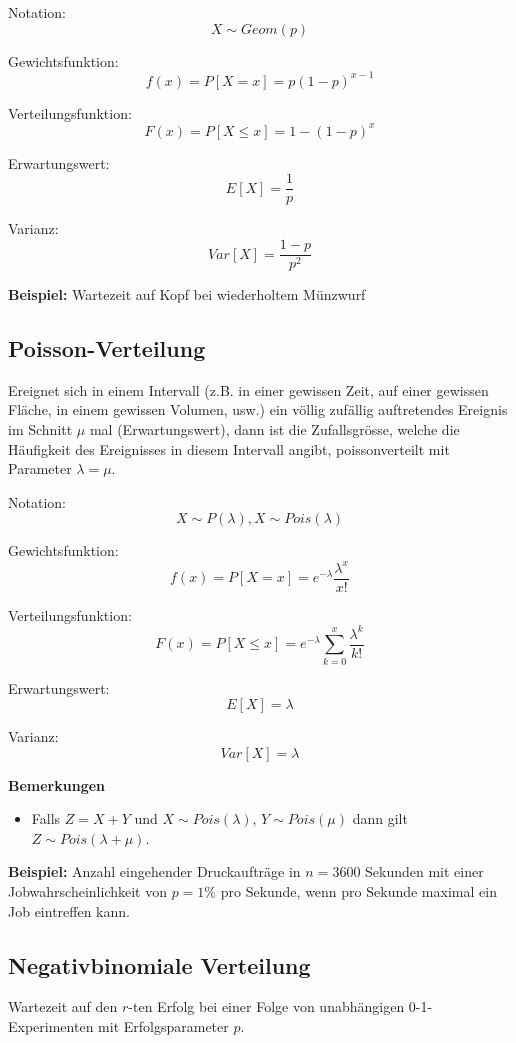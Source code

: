 \documentclass[10pt,a4paper,twocolumn]{article}
\begin{document}
\vspace{10pt}

Notation:
\[
X \sim Geom(p)
\]

Gewichtsfunktion:
\[
f(x)=P[X=x]=p(1-p)^{x-1}
\]

Verteilungsfunktion:
\[
F(x)=P[X \leq x]=1-(1-p)^{x}
\]

Erwartungswert:
\[
E[X]=\frac{1}{p}
\]

Varianz:
\[
Var[X]=\frac{1-p}{p^2}
\]

\textbf{Beispiel:} Wartezeit auf Kopf bei wiederholtem Münzwurf

\subsection{Poisson-Verteilung}
Ereignet sich in einem Intervall (z.B. in einer gewissen Zeit, auf einer gewissen Fläche, in einem gewissen Volumen, usw.) ein völlig zufällig auftretendes Ereignis im Schnitt $\mu$ mal (Erwartungswert), dann ist die Zufallsgrösse, welche die Häufigkeit des Ereignisses in diesem Intervall angibt, poissonverteilt mit Parameter $\lambda=\mu$.

\vspace{10pt}

Notation:
\[
X \sim P(\lambda), X \sim Pois(\lambda)
\]

Gewichtsfunktion:
\[
f(x)=P[X=x]=e^{-\lambda}\frac{\lambda^{x}}{x!}
\]

Verteilungsfunktion:
\[
F(x)=P[X \leq x]=e^{-\lambda}\sum \limits_{k=0}^x \frac{\lambda^{k}}{k!}
\]

Erwartungswert:
\[
E[X]=\lambda
\]

Varianz:
\[
Var[X]=\lambda
\]

\textbf{Bemerkungen}
\begin{itemize}
\item Falls $Z=X+Y$ und $X\sim Pois(\lambda)$, $Y\sim Pois(\mu)$ dann gilt $Z\sim Pois(\lambda+\mu)$.
\end{itemize}

\textbf{Beispiel:} Anzahl eingehender Druckaufträge in $n=3600$ Sekunden mit einer Jobwahrscheinlichkeit von $p=1\%$ pro Sekunde, wenn pro Sekunde maximal ein Job eintreffen kann.

\subsection{Negativbinomiale Verteilung}
Wartezeit auf den $r$-ten Erfolg bei einer Folge von unabhängigen 0-1-Experimenten mit Erfolgsparameter $p$.
\end{document}
